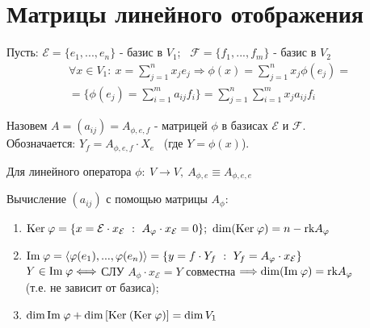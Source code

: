 \section{Матрицы линейного отображения}
    Пусть: $\mathcal{E} = \{e_1,...,e_n\}$ - базис в $V_1$; \ $\mathcal{F} = \{f_1,...,f_m\}$ - базис в $V_2$
    \begin{multline*}
        \forall x \in V_1 : \ x = \sum \limits_{j=1}^n x_je_j \Longrightarrow \phi(x) = \sum \limits_{j=1}^n x_j \phi(e_j)= \\ 
        = \{\phi(e_j) = \sum \limits_{i=1}^m a_{ij}f_i\} = \sum \limits_{j=1}^n \sum \limits_{i=1}^m x_ja_{ij}f_i
    \end{multline*}
    \begin{definition}
        Назовем $A = (a_{ij}) = A_{\phi,e,f}$ - матрицей $\phi$ в базисах $\mathcal{E}$ и $\mathcal{F}$.\\ 
        Обозначается: $Y_f = A_{\phi,e,f} \cdot X_e$ \ (где $Y = \phi(x)$).    
    \end{definition} 
    \begin{remark}
        Для линейного оператора $\phi: \ V \to V, \ A_{\phi,e}\equiv A_{\phi,e,e}$ 
    \end{remark}
    \begin{algorithm} 
        Вычисление $(a_{ij})$ с помощью матрицы $A_\phi :$
        \begin{enumerate}
            \item $\text{Ker} \hspace{0.09cm} \phi = \{x = \mathcal{E} \cdot x_\mathcal{E} \ : \ A_\phi \cdot x_\mathcal{E} = 0\}; \ \dim (\text{Ker} \hspace{0.09cm} \phi) = n - \text{rk} A_\phi$
            \item $\text{Im} \hspace{0.09cm} \phi = \langle \phi(e_1),...,\phi(e_n) \rangle = \{y = f \cdot Y_f \ : \ Y_f = A_\phi \cdot x_\mathcal{E}\}$ \\
            $Y \in \text{Im} \hspace{0.09cm} \phi \Longleftrightarrow $ СЛУ $A_\phi \cdot x_\mathcal{E} = Y$ совместна $\Longrightarrow \dim (\text{Im} \hspace{0.09cm} \phi) = \text{rk} A_\phi$ \\ (т.е. не зависит от базиса);
            \item $\dim \text{Im} \hspace{0.09cm} \phi + \dim \left[ \text{Ker} \hspace{0.09cm} (\text{Ker} \hspace{0.09cm} \phi)\right] = \dim V_1$   
        \end{enumerate}
    \end{algorithm}
